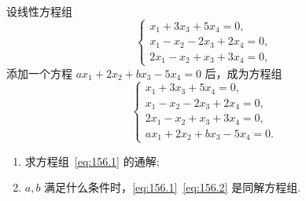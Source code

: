 	\begin{titwo}
		设线性方程组
		\begin{equation}\label{eq:156.1}
			\begin{cases}
				x_{1} + 3x_{3} + 5x_{4} = 0, \\
				x_{1} - x_{2} - 2x_{3} + 2x_{4} = 0, \\
				2x_{1} - x_{2} + x_{3} + 3x_{4} = 0,
			\end{cases}
		\end{equation}
		添加一个方程 $a x_{1} + 2x_{2} + b x_{3} - 5x_{4} = 0$ 后，成为方程组
		\begin{equation}\label{eq:156.2}
			\begin{cases}
				x_{1} + 3x_{3} + 5x_{4} = 0, \\
				x_{1} - x_{2} - 2x_{3} + 2x_{4} = 0, \\
				2x_{1} - x_{2} + x_{3} + 3x_{4} = 0, \\
				ax_{1} + 2x_{2} + bx_{3} - 5x_{4} = 0.
			\end{cases}
		\end{equation}
		\begin{enumerate}
			\item 求方程组~\eqref{eq:156.1} 的通解;
			\item $a,b$ 满足什么条件时，\eqref{eq:156.1}~\eqref{eq:156.2} 是同解方程组.
		\end{enumerate}
	\end{titwo}